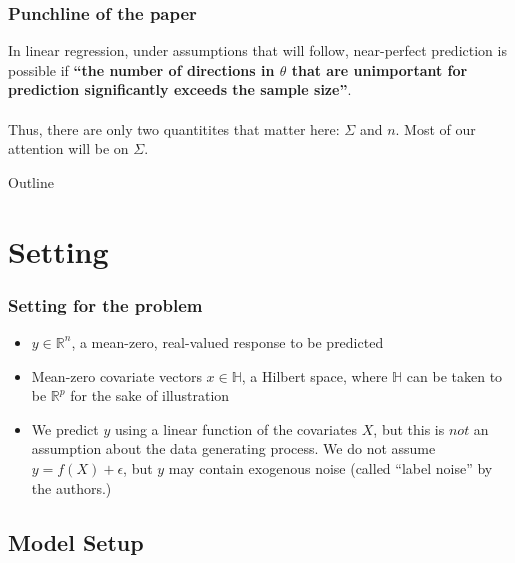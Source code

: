 \documentclass[pdf]{beamer}
\begin{document}
\begin{frame}

\frametitle{Punchline of the paper}

In linear regression, under assumptions that will follow, near-perfect prediction is possible if \textbf{``the number of directions in $\theta$ that are unimportant for prediction significantly exceeds the sample size''}.\\~\\

Thus, there are only two quantitites that matter here: $\Sigma$ and $n$.  Most of our attention will be on $\Sigma$.
\end{frame}

\begin{frame}{Outline}
    \tableofcontents
\end{frame}


\section{Setting}

\begin{frame}
\frametitle{Setting for the problem}

\begin{itemize}
\item $y\in \mathbb{R}^{n}$, a mean-zero, real-valued response to be predicted 
\item Mean-zero covariate vectors $x \in \mathbb{H}$, a Hilbert space, where $\mathbb{H}$ can be taken to be $\mathbb{R}^{p}$ for the sake of illustration
\item We predict $y$ using a linear function of the covariates $X$, but this is $\textit{not}$ an assumption about the data generating process.  We do not assume  $y = f(X) + \epsilon$, but $y$ may contain exogenous noise (called ``label noise'' by the authors.)
\end{itemize}
\end{frame}

\subsection{Model Setup}
\end{document}
